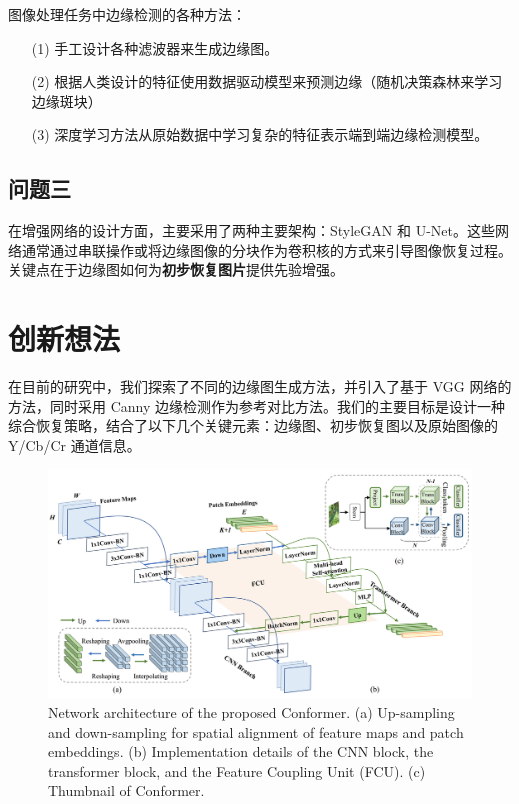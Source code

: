 \documentclass[a4paper]{ctexart}
\begin{document}
	图像处理任务中边缘检测的各种方法：
	
	\begin{itemize}
		\item[(1)] 
		手工设计各种滤波器来生成边缘图。
		
		\item[(2)]
		根据人类设计的特征使用数据驱动模型来预测边缘（随机决策森林来学习边缘斑块）
		
		\item[(3)]
		深度学习方法从原始数据中学习复杂的特征表示端到端边缘检测模型。
	\end{itemize}	
	
	\subsection{问题三}
	
	在增强网络的设计方面，主要采用了两种主要架构：StyleGAN 和 U-Net。这些网络通常通过串联操作或将边缘图像的分块作为卷积核的方式来引导图像恢复过程。关键点在于边缘图如何为\textbf{初步恢复图片}提供先验增强。
	
	\section{创新想法}
	
	在目前的研究中，我们探索了不同的边缘图生成方法，并引入了基于 VGG 网络的方法，同时采用 Canny 边缘检测作为参考对比方法。我们的主要目标是设计一种综合恢复策略，结合了以下几个关键元素：边缘图、初步恢复图以及原始图像的 Y/Cb/Cr 通道信息。
	
	\begin{figure}[htbp]
		\centering 
		\includegraphics[width=\columnwidth]{picture/LLIE/Conformer/the proposed Conformer}
		\caption{
			\label{fig: Conformer architecture} 
			Network architecture of the proposed Conformer. (a) Up-sampling and down-sampling for spatial alignment of
			feature maps and patch embeddings. (b) Implementation details of the CNN block, the transformer block, and the Feature Coupling Unit (FCU). (c) Thumbnail of Conformer.
		}
	\end{figure}
	
\end{document}
